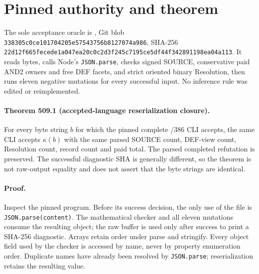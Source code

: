 \documentclass[11pt]{article}
\begin{document}
\section{Pinned authority and theorem}
The sole acceptance oracle is
, Git blob
\texttt{338305c0ce101704205e57543756b8127074a986}, SHA-256
\texttt{22d12f665fecede1a047ea20c0c2d3f245c7195ce5df44f342891198ea04a113}.
It reads bytes, calls Node's \texttt{JSON.parse}, checks signed SOURCE,
conservative paid AND2 owners and free DEF facets, and strict oriented binary
Resolution, then runs eleven negative mutations for every successful input.
No inference rule was edited or reimplemented.

\paragraph{Theorem 509.1 (accepted-language reserialization closure).}
For every byte string $b$ for which the pinned complete /386 CLI accepts,
the same CLI accepts $\kappa(b)$ with the same parsed SOURCE count, DEF-view
count, Resolution count, record count and paid total.  The parsed completed
refutation is preserved.  The successful diagnostic SHA is generally
different, so the theorem is not raw-output equality and does not assert that
the byte strings are identical.

\paragraph{Proof.}
Inspect the pinned program.  Before its success decision, the only use of the
file is \texttt{JSON.parse(content)}.  The mathematical checker and all eleven
mutations consume the resulting object; the raw buffer is used only after
success to print a SHA-256 diagnostic.  Arrays retain order under parse and
stringify.  Every object field used by the checker is accessed by name, never
by property enumeration order.  Duplicate names have already been resolved by
\texttt{JSON.parse}; reserialization retains the resulting value.
\end{document}

